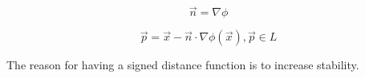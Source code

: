 \begin{equation}
\label{eq:normal2}
 \vec{n} = \nabla \phi
\end{equation} 

\begin{equation}
\label{eq:find_point}
 \vec{p} = \vec{x} - \vec{n} \cdot \nabla\phi(\vec{x}), \vec{p} \in L
\end{equation} 

The reason for having a signed distance function is to increase stability. 